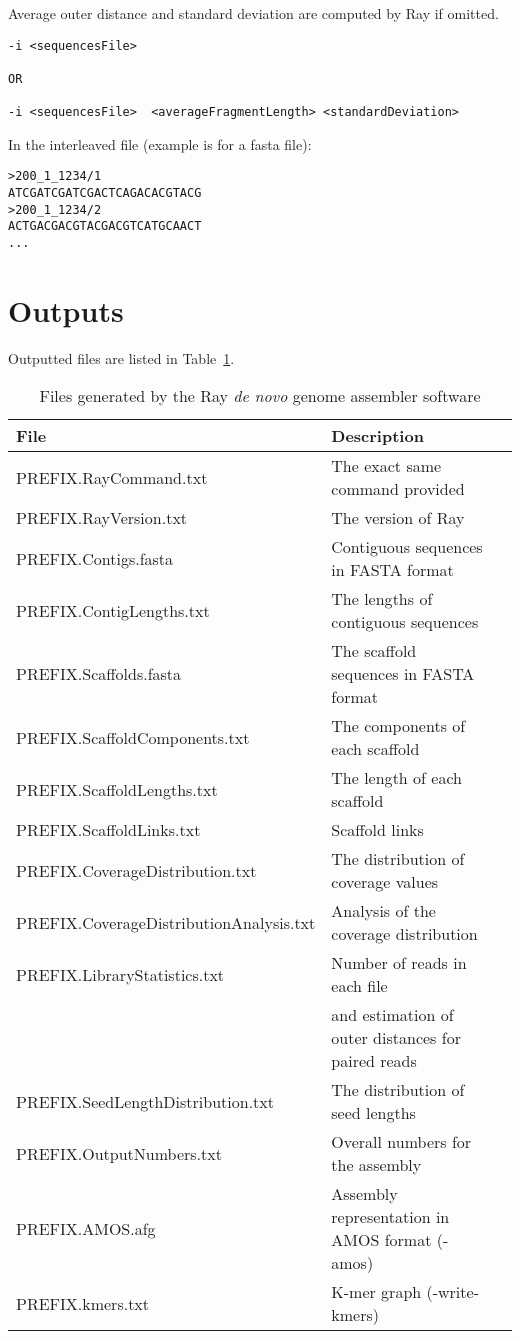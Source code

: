\documentclass{article}
\begin{document}
Average outer distance and standard deviation are computed by Ray if omitted.

\begin{verbatim}
-i <sequencesFile>

OR

-i <sequencesFile>  <averageFragmentLength> <standardDeviation> 
\end{verbatim}

In the interleaved file (example is for a fasta file):

\begin{verbatim}
>200_1_1234/1
ATCGATCGATCGACTCAGACACGTACG
>200_1_1234/2
ACTGACGACGTACGACGTCATGCAACT
...
\end{verbatim}



\section{Outputs}

Outputted files are listed in Table~\ref{outputs}.

\begin{table}[h]
\caption{Files generated by the Ray \emph{de novo} genome assembler software}\label{outputs}
\begin{tabular}{lll}
\hline
File& Description\\
\hline
PREFIX.RayCommand.txt & The exact same command provided \\
PREFIX.RayVersion.txt & The version of Ray\\
PREFIX.Contigs.fasta & Contiguous sequences in FASTA format\\
PREFIX.ContigLengths.txt & The lengths of contiguous sequences\\
PREFIX.Scaffolds.fasta & The scaffold sequences in FASTA format \\
PREFIX.ScaffoldComponents.txt & The components of each scaffold\\
PREFIX.ScaffoldLengths.txt & The length of each scaffold \\
PREFIX.ScaffoldLinks.txt & Scaffold links \\
PREFIX.CoverageDistribution.txt & The distribution of coverage values \\
PREFIX.CoverageDistributionAnalysis.txt & Analysis of the coverage distribution \\
PREFIX.LibraryStatistics.txt & Number of reads in each file \\
 & and estimation of outer distances for paired reads \\
PREFIX.SeedLengthDistribution.txt & The distribution of seed lengths \\
PREFIX.OutputNumbers.txt & Overall numbers for the assembly\\
PREFIX.AMOS.afg & Assembly representation in AMOS format (-amos) \\
PREFIX.kmers.txt & K-mer graph (-write-kmers) \\
\hline
\end{tabular}
\end{table}
\end{document}
